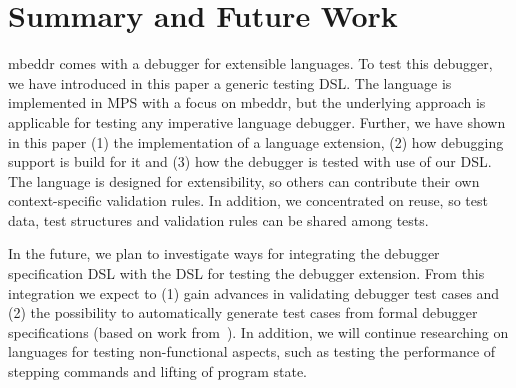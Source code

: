 \section{Summary and Future Work}

mbeddr comes with a debugger for extensible languages.
To test this debugger, we have introduced in this paper a generic testing \ac{DSL}.
The language is implemented in \ac{MPS} with a focus on mbeddr, but the
underlying approach is applicable for testing any imperative language debugger. Further, we
have shown in this paper (1) the implementation of a language extension, (2) how
debugging support is build for it and (3) how the debugger is tested with use of
our \ac{DSL}. The language is designed for extensibility, so others can contribute
their own context-specific validation rules. In addition, we concentrated on
reuse, so test data, test structures and validation rules can be shared among
tests.

In the future, we plan to investigate ways for integrating the debugger
specification \ac{DSL} with the \ac{DSL} for testing the debugger extension. From this
integration we expect to (1) gain advances in validating debugger test cases and
(2) the possibility to automatically generate test cases from formal debugger
specifications (based on work from~\cite{conf/kbse/WuG05,henriques05}). 
In addition, we will continue
researching on languages for testing non-functional aspects, such as testing the
performance of stepping commands and lifting of program state.